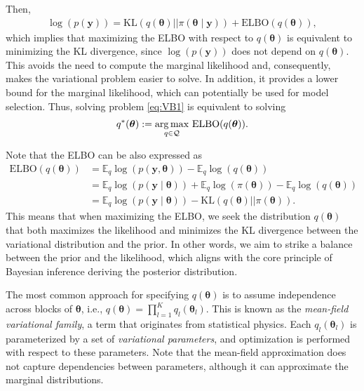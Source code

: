 Then,
\begin{align*}
	\log(p(\boldsymbol{y})) = \text{KL}(q(\boldsymbol{\theta})||\pi(\boldsymbol{\theta} \mid \mathbf{y})) + \text{ELBO}(q(\boldsymbol{\theta})),  
\end{align*} 
which implies that maximizing the ELBO with respect to $q(\boldsymbol{\theta})$ is equivalent to minimizing the KL divergence, since $\log(p(\boldsymbol{y}))$ does not depend on $q(\boldsymbol{\theta})$. This avoids the need to compute the marginal likelihood and, consequently, makes the variational problem easier to solve. In addition, it provides a lower bound for the marginal likelihood, which can potentially be used for model selection. Thus, solving problem \ref{eq:VB1} is equivalent to solving
\begin{align}\label{eq:VB2}
	q^*(\boldsymbol{\theta}):=\underset{q \in \mathcal{Q}}{\argmax} \  \text{ELBO}(q(\boldsymbol{\theta})).
\end{align}

Note that the ELBO can be also expressed as 
\begin{align*}
	\text{ELBO}(q(\boldsymbol{\theta}))&=\mathbb{E}_q\log(p(\boldsymbol{y}, \boldsymbol{\theta}))-\mathbb{E}_q\log(q(\boldsymbol{\theta}))\\
	&=\mathbb{E}_q\log(p(\boldsymbol{y}\mid \boldsymbol{\theta}))+\mathbb{E}_q\log(\pi(\boldsymbol{\theta}))-\mathbb{E}_q\log(q(\boldsymbol{\theta}))\\
	&=\mathbb{E}_q\log(p(\boldsymbol{y}\mid \boldsymbol{\theta}))-\text{KL}(q(\boldsymbol{\theta})||\pi(\boldsymbol{\theta})).
\end{align*} 
This means that when maximizing the ELBO, we seek the distribution $q(\boldsymbol{\theta})$ that both maximizes the likelihood and minimizes the KL divergence between the variational distribution and the prior. In other words, we aim to strike a balance between the prior and the likelihood, which aligns with the core principle of Bayesian inference deriving the posterior distribution.

The most common approach for specifying $q(\boldsymbol{\theta})$ is to assume independence across blocks of $\boldsymbol{\theta}$, i.e., $q(\boldsymbol{\theta}) = \prod_{l=1}^K q_l(\boldsymbol{\theta}_l)$. This is known as the \textit{mean-field variational family}, a term that originates from statistical physics. Each $q_l(\boldsymbol{\theta}_l)$ is parameterized by a set of \textit{variational parameters}, and optimization is performed with respect to these parameters. Note that the mean-field approximation does not capture dependencies between parameters, although it can approximate the marginal distributions.

